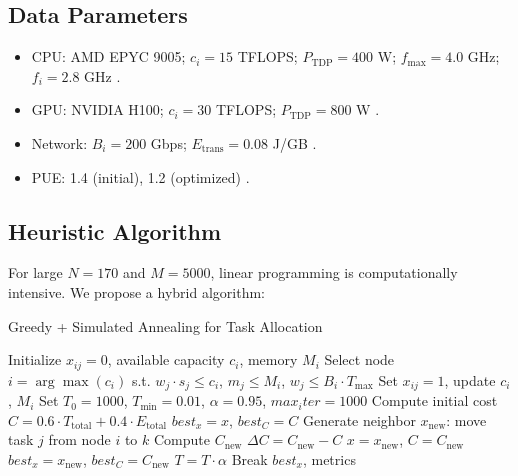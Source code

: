 \documentclass[a4paper,11pt]{article}
\begin{document}
\subsection{Data Parameters}
\begin{itemize}\raggedright
    \item CPU: AMD EPYC 9005; $c_i = 15$ TFLOPS; $P_{\text{TDP}} = 400$ W; $f_{\text{max}} = 4.0$ GHz; $f_i = 2.8$ GHz \cite{AMD2025}.\par
    \item GPU: NVIDIA H100; $c_i = 30$ TFLOPS; $P_{\text{TDP}} = 800$ W \cite{NVIDIA2025}.\par
    \item Network: $B_i = 200$ Gbps; $E_{\text{trans}} = 0.08$ J/GB \cite{CERNNetwork2025}.\par
    \item PUE: 1.4 (initial), 1.2 (optimized) \cite{CERNDataCenter2025}.\par
\end{itemize}

\subsection{Heuristic Algorithm}
For large $N=170$ and $M=5000$, linear programming is computationally intensive. We propose a hybrid algorithm:

\begin{algorithm}
\caption{Greedy + Simulated Annealing for Task Allocation}
\begin{algorithmic}
\State Initialize $x_{ij} = 0$, available capacity $c_i$, memory $M_i$
    \State Select node $i = \arg\max(c_i)$ s.t. $w_j \cdot s_j \leq c_i$, $m_j \leq M_i$, $w_j \leq B_i \cdot T_{\text{max}}$
    \State Set $x_{ij} = 1$, update $c_i$, $M_i$
\EndFor
\State Set $T_0 = 1000$, $T_{\text{min}} = 0.01$, $\alpha = 0.95$, $max_iter = 1000$
\State Compute initial cost $C = 0.6 \cdot T_{\text{total}} + 0.4 \cdot E_{\text{total}}$
\State $best_x = x$, $best_C = C$
    \State Generate neighbor $x_{\text{new}}$: move task $j$ from node $i$ to $k$
        \State Compute $C_{\text{new}}$
        \State $\Delta C = C_{\text{new}} - C$
            \State $x = x_{\text{new}}$, $C = C_{\text{new}}$
                \State $best_x = x_{\text{new}}$, $best_C = C_{\text{new}}$
            \EndIf
        \EndIf
    \EndIf
    \State $T = T \cdot \alpha$
        \State Break
    \EndIf
\EndFor
\State \Return $best_x$, metrics
\end{algorithmic}
\end{algorithm}
\end{document}
